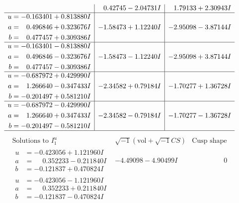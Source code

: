 \documentclass[1p]{elsarticle_modified}
\theoremstyle{definition}
\newcommand{\I}{\sqrt{-1}}
\begin{document}
$$\begin{array}{c|c|c}
 & \phantom{-}0.42745 - 2.04731 I & \phantom{-}1.79133 + 2.30943 I \\ \hline\begin{aligned}
u &= -0.163401 + 0.813880 I \\
a &= \phantom{-}0.496846 + 0.323676 I \\
b &= \phantom{-}0.477457 + 0.309386 I\end{aligned}
 & -1.58473 + 1.12240 I & -2.95098 - 3.87144 I \\ \hline\begin{aligned}
u &= -0.163401 - 0.813880 I \\
a &= \phantom{-}0.496846 - 0.323676 I \\
b &= \phantom{-}0.477457 - 0.309386 I\end{aligned}
 & -1.58473 - 1.12240 I & -2.95098 + 3.87144 I \\ \hline\begin{aligned}
u &= -0.687972 + 0.429990 I \\
a &= \phantom{-}1.266640 - 0.347433 I \\
b &= -0.201497 + 0.581210 I\end{aligned}
 & -2.34582 + 0.79184 I & -1.70277 + 1.36728 I \\ \hline\begin{aligned}
u &= -0.687972 - 0.429990 I \\
a &= \phantom{-}1.266640 + 0.347433 I \\
b &= -0.201497 - 0.581210 I\end{aligned}
 & -2.34582 - 0.79184 I & -1.70277 - 1.36728 I\\
 \hline 
 \end{array}$$\newpage$$\begin{array}{c|c|c}  
\text{Solutions to }I^u_{1}& \I (\text{vol} + \sqrt{-1}CS) & \text{Cusp shape}\\
 \hline 
\begin{aligned}
u &= -0.423056 + 1.121960 I \\
a &= \phantom{-}0.352233 - 0.211840 I \\
b &= -0.121837 + 0.470824 I\end{aligned}
 & -4.49098 - 4.90499 I & \phantom{-0.000000 } 0 \\ \hline\begin{aligned}
u &= -0.423056 - 1.121960 I \\
a &= \phantom{-}0.352233 + 0.211840 I \\
b &= -0.121837 - 0.470824 I\end{aligned}

\end{array}$$
\end{document}
